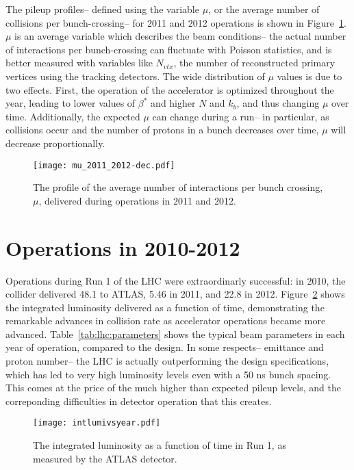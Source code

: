 The pileup profiles-- defined using the variable $\mu$, or the average number of collisions per bunch-crossing-- for 2011 and 2012 operations is shown in Figure~\ref{fig:lhc:mu-profile}. $\mu$ is an average variable which describes the beam conditions-- the actual number of interactions per bunch-crossing can fluctuate with Poisson statistics, and is better measured with variables like $N_{vtx}$, the number of reconstructed primary vertices using the tracking detectors. The wide distribution of $\mu$ values is due to two effects. First, the operation of the accelerator is optimized throughout the year, leading to lower values of $\beta^*$ and higher $N$ and $k_b$, and thus changing $\mu$ over time. Additionally, the expected $\mu$ can change during a run-- in particular, as collisions occur and the number of protons in a bunch decreases over time, $\mu$ will decrease proportionally.


\begin{figure}
\centering
\texttt{[image: mu\_2011\_2012-dec.pdf]}
\label{fig:lhc:mu-profile}
\caption{The profile of the average number of interactions per bunch crossing, $\mu$, delivered during operations in 2011 and 2012.}
\end{figure}



\section{Operations in 2010-2012}

Operations during Run 1 of the LHC were extraordinarly successful: in 2010, the collider delivered 48.1 \ipb to ATLAS, 5.46 \ifb in 2011, and 22.8 \ifb in 2012. Figure~\ref{fig:lhc:lumivsyear} shows the integrated luminosity delivered as a function of time, demonstrating the remarkable advances in collision rate as accelerator operations became more advanced. Table~\ref{tab:lhc:parameters} shows the typical beam parameters in each year of operation, compared to the design. In some respects-- emittance and proton number-- the LHC is actually outperforming the design specifications, which has led to very high luminosity levels even with a 50 ns bunch spacing. This comes at the price of the much higher than expected pileup levels, and the correponding difficulties in detector operation that this creates.


\begin{figure}
\centering
\texttt{[image: intlumivsyear.pdf]}
\label{fig:lhc:lumivsyear}
\caption{The integrated luminosity as a function of time in Run 1, as measured by the ATLAS detector.}
\end{figure}

